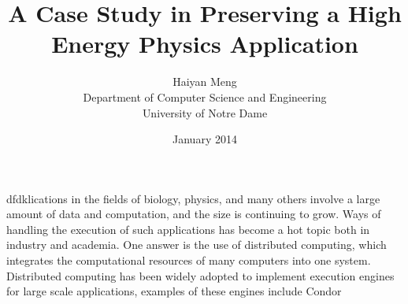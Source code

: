 \documentclass{article}
\begin{document}
\title{A Case Study in Preserving a High Energy Physics Application}
\author{Haiyan Meng\\ Department of Computer Science and Engineering\\ University of Notre Dame}
\date{January 2014}
\maketitle

dfdk\cite{Laboratories79make}lications in the fields of biology, physics, and many others involve a large amount of data and computation, and the size is continuing to grow. Ways of handling the execution of such applications has become a hot topic both in industry and academia. One answer is the use of distributed computing, which integrates the computational resources of many computers into one system. Distributed computing has been widely adopted to implement execution engines for large scale applications, examples of these engines include Condor




\end{document}
